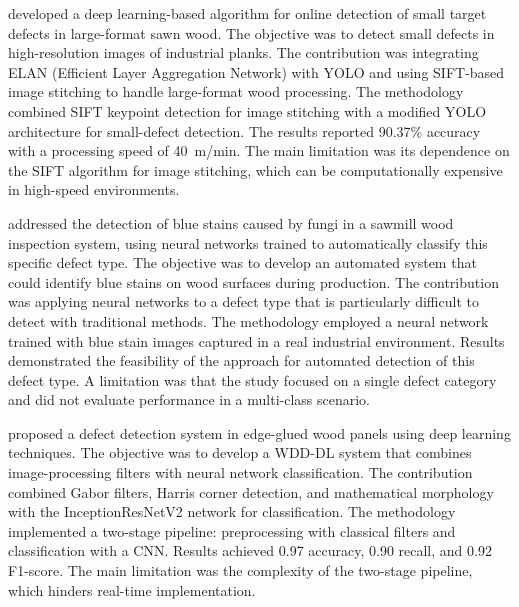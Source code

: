 \documentclass[pdflatex,sn-basic,Numbered,iicol]{sn-jnl}
\begin{document}
\citet{ji2024online} developed a deep learning-based algorithm for online detection of small target defects in large-format sawn wood. The objective was to detect small defects in high-resolution images of industrial planks. The contribution was integrating ELAN (Efficient Layer Aggregation Network) with YOLO and using SIFT-based image stitching to handle large-format wood processing. The methodology combined SIFT keypoint detection for image stitching with a modified YOLO architecture for small-defect detection. The results reported 90.37\% accuracy with a processing speed of 40~m/min. The main limitation was its dependence on the SIFT algorithm for image stitching, which can be computationally expensive in high-speed environments.

\citet{wolszczak2024bluestain} addressed the detection of blue stains caused by fungi in a sawmill wood inspection system, using neural networks trained to automatically classify this specific defect type. The objective was to develop an automated system that could identify blue stains on wood surfaces during production. The contribution was applying neural networks to a defect type that is particularly difficult to detect with traditional methods. The methodology employed a neural network trained with blue stain images captured in a real industrial environment. Results demonstrated the feasibility of the approach for automated detection of this defect type. A limitation was that the study focused on a single defect category and did not evaluate performance in a multi-class scenario.

\citet{chen2022edgeglued} proposed a defect detection system in edge-glued wood panels using deep learning techniques. The objective was to develop a WDD-DL system that combines image-processing filters with neural network classification. The contribution combined Gabor filters, Harris corner detection, and mathematical morphology with the InceptionResNetV2 network for classification. The methodology implemented a two-stage pipeline: preprocessing with classical filters and classification with a CNN. Results achieved 0.97 accuracy, 0.90 recall, and 0.92 F1-score. The main limitation was the complexity of the two-stage pipeline, which hinders real-time implementation.
\end{document}
